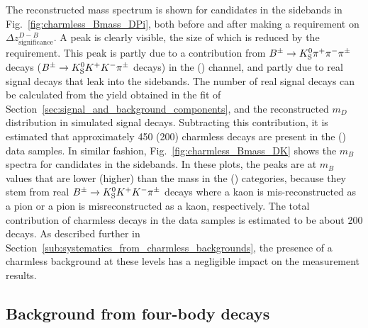 The reconstructed \B mass spectrum is shown for \BtoDpi candidates in the \D sidebands in Fig.~\ref{fig:charmless_Bmass_DPi}, both before and after making a requirement on $\Delta z^{D-B}_{\text{significance}}$. A peak is clearly visible, the size of which is reduced by the requirement. This peak is partly due to a contribution from ${{B}^\pm}\rightarrow{\ensuremath{{K}^0_{\mathrm{S}}}}{\ensuremath{{\pi}^+}}{\ensuremath{{\pi}^-}}{\ensuremath{{\pi}^\pm}}$ decays (${{{B}^\pm}\rightarrow{\ensuremath{{K}^0_{\mathrm{S}}}}{\ensuremath{{K}^+}}{\ensuremath{{K}^-}}{\ensuremath{{\pi}^\pm}}}$ decays) in the \DtoKspipi (\DtoKsKK) channel, and partly due to real signal decays that leak into the \D sidebands. The number of real signal decays can be calculated from the yield obtained in the fit of Section~\ref{sec:signal_and_background_components}, and the reconstructed $m_D$ distribution in simulated signal decays. Subtracting this contribution, it is estimated that approximately 450 (200) charmless decays are present in the \Kspipi (\KsKK) data samples. In similar fashion, Fig.~\ref{fig:charmless_Bmass_DK} shows the $m_B$ spectra for \BtoDK candidates in the \D sidebands. In these plots, the peaks are at $m_B$ values that are lower (higher) than the \B mass in the \KsPiPi (\KsKK) categories, because they stem from real ${{B}^\pm}\rightarrow{\ensuremath{{K}^0_{\mathrm{S}}}}{\ensuremath{{K}^+}}{\ensuremath{{K}^-}}{\ensuremath{{\pi}^\pm}}$ decays where a kaon is mis-reconstructed as a pion or a pion is misreconstructed as a kaon, respectively. The total contribution of charmless decays in the \BtoDK data samples is estimated to be about 200 decays. As described further in Section~\ref{sub:systematics_from_charmless_backgrounds}, the presence of a charmless background at these levels has a negligible impact on the measurement results.


\subsection{\texorpdfstring{Background from four-body \D decays}{Background from four-body D decays}}%
\label{sub:background_from_four_body_d_decays}

